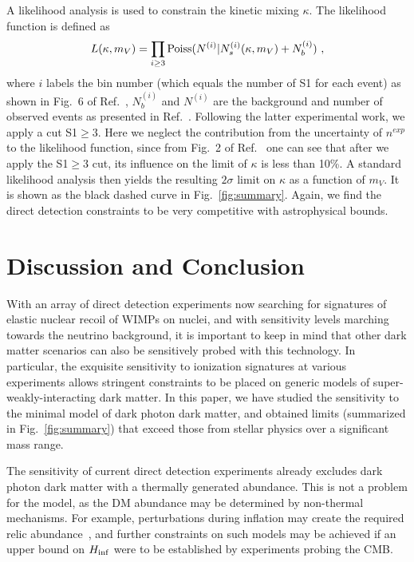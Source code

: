\documentclass[prd,reprint,nofootinbib,notitlepage,aps,tightenlines,preprintnumbers,amsmath,amssymb,showpacs,superscriptaddress]{revtex4-1}
\begin{document}
A likelihood analysis is used to constrain the kinetic mixing
$\kappa$. The likelihood function is defined as
\begin{equation}
L(\kappa, m_V) = \prod_{i\geq3} {\rm Poiss}(N^{(i)}|N_s^{(i)}(\kappa, m_V)+N_b^{(i)}) \ ,
\end{equation}
where $i$ labels the bin number (which equals the number of S1 for
each event) as shown in Fig.~6 of Ref.~\cite{Aprile:2014eoa},
$N_b^{(i)}$ and $N^{(i)}$ are the background and number of observed
events as presented in Ref.~\cite{Aprile:2014eoa}. Following the
latter experimental work, we apply a cut S1$\geq3$. Here we neglect
the contribution from the uncertainty of $n^{exp}$ to the likelihood
function, since from Fig.~2 of Ref.~\cite{Aprile:2014eoa} one can see
that after we apply the S1$\geq3$ cut, its influence on the limit of
$\kappa$ is less than 10\%. A standard likelihood analysis then yields
the resulting $2\sigma$  limit on $\kappa$ as a function of
$m_V$. It is shown as the black dashed curve in Fig.~\ref{fig:summary}.
Again, we find the direct detection constraints to be very competitive
with astrophysical bounds.



\section{Discussion and Conclusion}
\label{sec:disc-concl}

With an array of direct detection experiments now searching for
signatures of elastic nuclear recoil of WIMPs on nuclei, and with
sensitivity levels marching towards the neutrino background, it is
important to keep in mind that other dark matter scenarios can also be
sensitively probed with this technology. In particular, the exquisite
sensitivity to ionization signatures at various experiments allows
stringent constraints to be placed on generic models of
super-weakly-interacting dark matter. In this paper, we have studied
the sensitivity to the minimal model of dark photon dark matter, and
obtained limits (summarized in Fig.~\ref{fig:summary}) that exceed
those from stellar physics over a significant mass range.

The sensitivity of current direct detection experiments already
excludes dark photon dark matter with a thermally generated abundance.
This is not a problem for the model, as the DM abundance may be
determined by non-thermal mechanisms. For example, perturbations
during inflation may create the required relic
abundance~\cite{Graham:2015rva}, and further constraints on such
models may be achieved if an upper bound on $H_{\rm inf}$ were to be
established by experiments probing the CMB.
\end{document}
